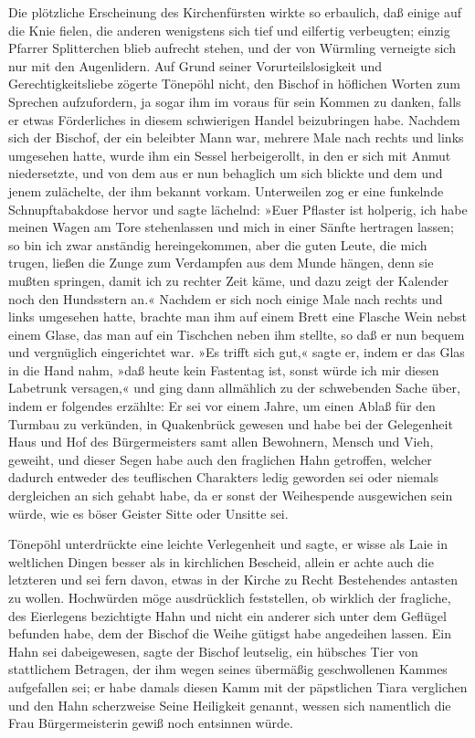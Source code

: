 Die plötzliche Erscheinung des Kirchenfürsten wirkte so erbaulich,
daß einige auf die Knie fielen, die anderen wenigstens sich tief
und eilfertig verbeugten; einzig Pfarrer Splitterchen blieb
aufrecht stehen, und der von Würmling verneigte sich nur mit den
Augenlidern. Auf Grund seiner Vorurteilslosigkeit und
Gerechtigkeitsliebe zögerte Tönepöhl nicht, den Bischof in
höflichen Worten zum Sprechen aufzufordern, ja sogar ihm im voraus
für sein Kommen zu danken, falls er etwas Förderliches in diesem
schwierigen Handel beizubringen habe. Nachdem sich der Bischof, der
ein beleibter Mann war, mehrere Male nach rechts und links
umgesehen hatte, wurde ihm ein Sessel herbeigerollt, in den er sich
mit Anmut niedersetzte, und von dem aus er nun behaglich um sich
blickte und dem und jenem zulächelte, der ihm bekannt vorkam.
Unterweilen zog er eine funkelnde Schnupftabakdose hervor und sagte
lächelnd: »Euer Pflaster ist holperig, ich habe meinen Wagen am
Tore stehenlassen und mich in einer Sänfte hertragen lassen; so bin
ich zwar anständig hereingekommen, aber die guten Leute, die mich
trugen, ließen die Zunge zum Verdampfen aus dem Munde hängen, denn
sie mußten springen, damit ich zu rechter Zeit käme, und dazu zeigt
der Kalender noch den Hundsstern an.« Nachdem er sich noch einige
Male nach rechts und links umgesehen hatte, brachte man ihm auf
einem Brett eine Flasche Wein nebst einem Glase, das man auf ein
Tischchen neben ihm stellte, so daß er nun bequem und vergnüglich
eingerichtet \pagenum{[39]} war. »Es trifft sich gut,« sagte er,
indem er das Glas in die Hand nahm, »daß heute kein Fastentag ist,
sonst würde ich mir diesen Labetrunk versagen,« und ging dann
allmählich zu der schwebenden Sache über, indem er folgendes
erzählte: Er sei vor einem Jahre, um einen Ablaß für den Turmbau zu
verkünden, in Quakenbrück gewesen und habe bei der Gelegenheit Haus
und Hof des Bürgermeisters samt allen Bewohnern, Mensch und Vieh,
geweiht, und dieser Segen habe auch den fraglichen Hahn getroffen,
welcher dadurch entweder des teuflischen Charakters ledig geworden
sei oder niemals dergleichen an sich gehabt habe, da er sonst der
Weihespende ausgewichen sein würde, wie es böser Geister Sitte oder
Unsitte sei.

Tönepöhl unterdrückte eine leichte Verlegenheit und sagte, er wisse
als Laie in weltlichen Dingen besser als in kirchlichen Bescheid,
allein er achte auch die letzteren und sei fern davon, etwas in der
Kirche zu Recht Bestehendes antasten zu wollen. Hochwürden möge
ausdrücklich feststellen, ob wirklich der fragliche, des Eierlegens
bezichtigte Hahn und nicht ein anderer sich unter dem Geflügel
befunden habe, dem der Bischof die Weihe gütigst habe angedeihen
lassen. Ein Hahn sei dabeigewesen, sagte der Bischof leutselig, ein
hübsches Tier von stattlichem Betragen, der ihm wegen seines
übermäßig geschwollenen Kammes aufgefallen sei; er habe damals
diesen Kamm mit der päpstlichen Tiara verglichen und den Hahn
scherzweise Seine Heiligkeit genannt, wessen sich namentlich die
Frau Bürgermeisterin gewiß noch entsinnen würde.

